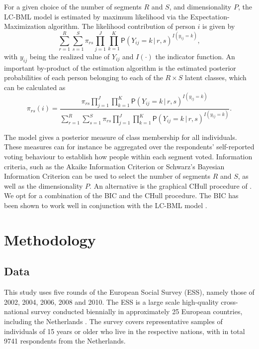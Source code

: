 \documentclass[12pt,letter]{article}\usepackage[]{graphicx}\usepackage[]{xcolor}
\newcommand{\Prob}{\mathsf{P}}
\begin{document}
For a given choice of the number of segments $R$ and $S$, and dimensionality $P$, the LC-BML model is estimated by maximum likelihood via the Expectation-Maximization \citep[EM;][]{dempster1977} algorithm. The likelihood contribution of person $i$ is given by
\begin{equation}
  \sum_{r=1}^{R} \sum_{s=1}^{S} \pi_{rs} \prod_{j=1}^{J} \prod_{k=1}^{K}
    \Prob (Y_{ij} = k \, | \, r,s)^{I(y_{ij} = k)},
\end{equation}
with $y_{ij}$ being the realized value of $Y_{ij}$ and $I(\cdot)$ the indicator function. An important by-product of the estimation algorithm is the estimated posterior probabilities of each person belonging to each of the $R \times S$ latent classes, which can be calculated as
\begin{equation}
  \pi_{rs} (i) = 
    \frac{\pi_{rs} \prod_{j = 1}^{J} \prod_{k=1}^{K} 
           \Prob (Y_{ij} = k \, | \, r,s)^{I(y_{ij} = k)}}
         {\sum_{r=1}^{R} \sum_{s=1}^{S}
         \pi_{rs} \prod_{j = 1}^{J} \prod_{k=1}^{K} 
           \Prob (Y_{ij} = k \, | \, r,s)^{I(y_{ij} = k)}}.
  \label{E:posterior}
\end{equation}

The model gives a posterior measure of class membership for all individuals. These measures can for instance be aggregated over the respondents' self-reported voting behaviour to establish how people within each segment voted. Information criteria, such as the Akaike Information Criterion \citep[AIC;][]{akaike1974} or Schwarz's Bayesian Information Criterion \citep[BIC;][]{schwarz1978} can be used to select the number of segments $R$ and $S$, as well as the dimensionality $P$. An alternative is the graphical CHull procedure of \citet{ceulemans2011}. We opt for a combination of the BIC and the CHull procedure. The BIC has been shown to work well in conjunction with the LC-BML model \citep{vanrosmalen2010}.

\section*{Methodology}

\subsection*{Data}







This study uses five rounds of the European Social Survey (ESS), namely those of 2002, 2004, 2006, 2008 and 2010. The ESS is a large scale high-quality cross-national survey conducted biennially in approximately 25 European countries, including the Netherlands \citep{jowell2007}. The survey covers representative samples of individuals of 15 years or older who live in the respective nations, with in total 9741 respondents from the Netherlands.
\end{document}

